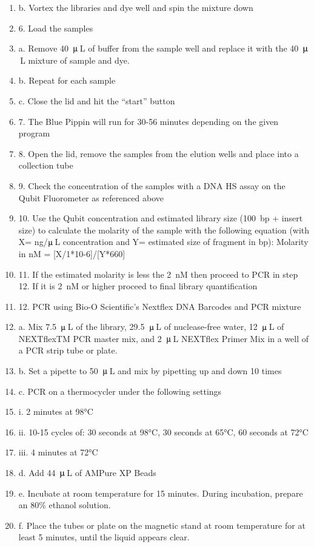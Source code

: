 \documentclass[graybox]{svmult}
\begin{document}
\begin{enumerate}
\item{b.      Vortex the libraries and dye well and spin the mixture down}
\item{6.      Load the samples}
\item{a.      Remove 40~$\umu$\,L of buffer from the sample well and replace it with the 40~$\umu$\,L mixture of sample and dye.}
\item{b.      Repeat for each sample}
\item{c.      Close the lid and hit the “start” button}
\item{7.      The Blue Pippin will run for 30-56 minutes depending on the given program}
\item{8.      Open the lid, remove the samples from the elution wells and place into a collection tube}
\item{9.      Check the concentration of the samples with a DNA HS assay on the Qubit Fluorometer as referenced above}
\item{10.      Use the Qubit concentration and estimated library size (100~bp + insert size) to calculate the molarity of the sample with the following equation (with X= ng/$\umu$\,L concentration and Y= estimated size of fragment in bp): Molarity in nM = [X/1*10-6]/[Y*660]}
\item{11.     If the estimated molarity is less the 2~nM then proceed to PCR in step 12. If it is 2~nM or higher proceed to final library quantification}
\item{12.     PCR using Bio-O Scientific’s Nextflex DNA Barcodes and PCR mixture}
\item{a.      Mix 7.5~$\umu$\,L of the library, 29.5~$\umu$\,L of nuclease-free water, 12~$\umu$\,L of NEXTflexTM PCR master mix, and 2~$\umu$\,L NEXTflex Primer Mix in a well of a PCR strip tube or plate.}
\item{b.      Set a pipette to 50~$\umu$\,L and mix by pipetting up and down 10 times}
\item{c.      PCR on a thermocycler under the following settings}
\item{i.      2 minutes at 98°C}
\item{ii.     10-15 cycles of: 30 seconds at 98°C, 30 seconds at 65°C, 60 seconds at 72°C}
\item{iii.    4 minutes at 72°C}
\item{d.      Add 44~$\umu$\,L of AMPure XP Beads}
\item{e.      Incubate at room temperature for 15 minutes. During incubation, prepare an 80\% ethanol solution.}
\item{f.      Place the tubes or plate on the magnetic stand at room temperature for at least 5 minutes, until the liquid appears clear.}

\end{enumerate}
\end{document}
